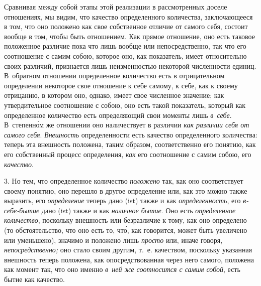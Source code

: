 Сравнивая между собой этапы этой реализации в рассмотренных доселе отношениях,
мы видим, что качество определенного количества, заключающееся в том, что оно
положено как свое собственное отличие от самого себя, состоит вообще в том,
чтобы быть отношением. Как прямое отношение, оно есть таковое положенное
различие пока что лишь вообще или непосредственно, так что его соотношение с
самим собою, которое оно, как показатель, имеет относительно своих различий,
признается лишь неизменностью некоторой численности единиц. В~обратном
отношении определенное количество есть в отрицательном определении некоторое
свое отношение к себе самому, к себе, как к своему отрицанию, в котором оно,
однако, имеет свое численное значение; как утвердительное соотношение с собою,
оно есть такой показатель, который как определенное количество есть
определяющий свои моменты лишь {\em в~себе}. В~степенн\'{о}м же отношении оно
наличествует в различии {\em как различии себя от самого себя}. {\em Внешность}
определенности есть качество определенного количества: теперь эта внешность
положена, таким образом, соответственно его понятию, как его собственный
процесс определения, {\em как} его соотношение с самим собою, его
{\em качество}.

3. Но тем, что определенное количество {\em положено} так, как оно
соответствует своему понятию, оно перешло в другое определение или, как это
можно также выразить, его {\em определение} теперь дано (ist) также и как
{\em определенность}, его {\em в-себе-бытие} дано (ist) также и как
{\em наличное бытие}. Оно есть {\em определенное количество}, поскольку
внешность или безразличие к тому, как оно определено (то обстоятельство, что
оно есть то, чт\'{о}, как говорится, может быть увеличено или уменьшено),
значимо и положено лишь {\em просто} или, иначе говоря, {\em непосредственно;}
оно стало своим другим, т.~е. качеством, поскольку указанная внешность теперь
положена, как опосредствованная через него самого, положена как момент так, что
оно именно {\em в~ней же соотносится с самим собой}, есть бытие как качество.

